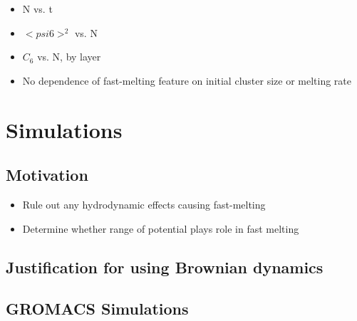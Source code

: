 \documentclass{umthesis}          %
\begin{document}
\begin{itemize}

\item N vs. t\\
\label{sec-2.2.3.1}


\item $< psi6 >^2$ vs. N\\
\label{sec-2.2.3.2}


\item $C_6$ vs. N, by layer\\
\label{sec-2.2.3.3}


\item No dependence of fast-melting feature on initial cluster size or melting rate\\
\label{sec-2.2.3.4}

\end{itemize} %
\section{Simulations}
\label{sec-2.3}

\subsection{Motivation}
\label{sec-2.3.1}

\begin{itemize}

\item Rule out any hydrodynamic effects causing fast-melting\\
\label{sec-2.3.1.1}


\item Determine whether range of potential plays role in fast melting\\
\label{sec-2.3.1.2}

\end{itemize} %
\subsection{Justification for using Brownian dynamics}
\label{sec-2.3.2}

\subsection{GROMACS Simulations}
\label{sec-2.3.3}
\end{document}
